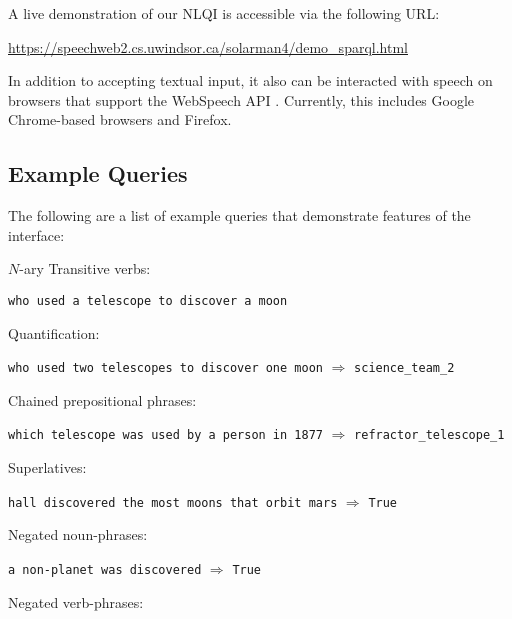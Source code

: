\documentclass[../main.tex]{subfiles}
\begin{document}
\begin{refsection}
\noindent A live demonstration of our NLQI is accessible via the following URL:
\begin{center}
	\url{https://speechweb2.cs.uwindsor.ca/solarman4/demo_sparql.html}
\end{center}
In addition to accepting textual input, it also can be interacted with speech on browsers that support the WebSpeech API \cite{world2018web}.  Currently, this includes Google Chrome-based browsers and Firefox.

\subsection{Example Queries}

The following are a list of example queries that demonstrate features of the interface:

\noindent $N$-ary Transitive verbs:

\newcommand{\examplespacing}{\vspace{0.5em}}

\examplespacing

\texttt{who used a telescope to discover a moon}

\examplespacing

\noindent Quantification:

\examplespacing

\texttt{who used two telescopes to discover one moon} $\Rightarrow$ \texttt{science\_team\_2}

\examplespacing

\noindent Chained prepositional phrases:

\examplespacing

\texttt{which telescope was used by a person in 1877} $\Rightarrow$ \texttt{refractor\_telescope\_1}

\noindent Superlatives:

\examplespacing

\texttt{hall discovered the most moons that orbit mars} $\Rightarrow$ \texttt{True}

\examplespacing

\noindent Negated noun-phrases:

\examplespacing

\texttt{a non-planet was discovered} $\Rightarrow$ \texttt{True}

\examplespacing

\noindent Negated verb-phrases:

\examplespacing


\end{refsection}
\end{document}
